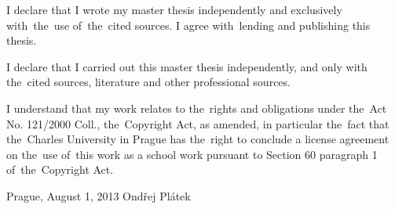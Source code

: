 \vspace{\fill} %
\noindent
I declare that I wrote my master thesis independently and exclusively with~the~use of~the~cited sources. I agree with~lending and publishing this thesis.


\medskip\noindent
I declare that I carried out this master thesis independently, and only with the~cited sources, literature and other professional sources.

I understand that my work relates to the~rights and obligations under the~Act No. 121/2000 Coll., the~Copyright Act, as amended, in particular the~fact that the~Charles University in Prague has the~right to conclude a license agreement on the~use of~this work as a school work pursuant to Section 60 paragraph 1 of~the~Copyright Act.

\noindent Prague, August 1, 2013 \hspace{\fill}Ondřej Plátek 


%

\newpage

